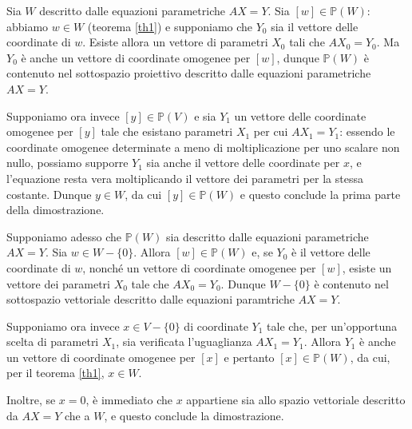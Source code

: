 \Proof Sia $W$ descritto dalle equazioni parametriche $AX = Y$. Sia $[w] \in \mathbb{P}(W)$: abbiamo $w \in W$ (teorema \ref{th1}) e supponiamo che $Y_0$ sia il vettore delle coordinate di $w$. Esiste allora un vettore di parametri $X_0$ tali che $AX_0 = Y_0$. Ma $Y_0$ \`e anche un vettore di coordinate omogenee per $[w]$, dunque $\mathbb{P}(W)$ \`e contenuto nel sottospazio proiettivo descritto dalle equazioni parametriche $AX = Y$.
	\par Supponiamo ora invece $[y] \in \mathbb{P}(V)$ e sia $Y_1$ un vettore delle coordinate omogenee per $[y]$ tale che esistano parametri $X_1$ per cui $AX_1 = Y_1$: essendo le coordinate omogenee determinate a meno di moltiplicazione per uno scalare non nullo, possiamo supporre $Y_1$ sia anche il vettore delle coordinate per $x$, e l'equazione resta vera moltiplicando il vettore dei parametri per la stessa costante. Dunque $y \in W$, da cui $[y] \in \mathbb{P}(W)$ e questo conclude la prima parte della dimostrazione.
	\par Supponiamo adesso che $\mathbb{P}(W)$ sia descritto dalle equazioni parametriche $AX = Y$. Sia $w \in W - \lbrace 0 \rbrace$. Allora $[w] \in \mathbb{P}(W)$ e, se $Y_0$ \`e il vettore delle coordinate di $w$, nonch\'e un vettore di coordinate omogenee per $[w]$, esiste un vettore dei parametri $X_0$ tale che $AX_0 = Y_0$. Dunque $W - \lbrace 0 \rbrace$ \`e contenuto nel sottospazio vettoriale descritto dalle equazioni paramtriche $AX = Y$.
	\par Supponiamo ora invece $x \in V - \lbrace 0 \rbrace$ di coordinate $Y_1$ tale che, per un'opportuna scelta di parametri $X_1$, sia verificata l'uguaglianza $AX_1 = Y_1$. Allora $Y_1$ \`e anche un vettore di coordinate omogenee per $[x]$ e pertanto $[x] \in \mathbb{P}(W)$, da cui, per il teorema \ref{th1}, $x \in W$.
	\par Inoltre, se $x = 0$, \`e immediato che $x$ appartiene sia allo spazio vettoriale descritto da $AX = Y$ che a $W$, e questo conclude la dimostrazione. \EndProof
